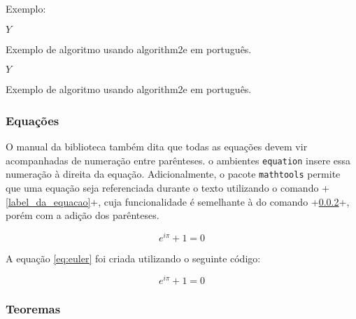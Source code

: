 \documentclass[xindy,rascunho]{fei}
\begin{document}
    Exemplo:

\begin{latexcode}
\begin{algorithm}
	\Retorna \(Y\)
	\caption{Exemplo de algoritmo usando algorithm2e em português.}
	\label{lst:alg}
\end{algorithm}
\end{latexcode}
    
\begin{algorithm}


\Retorna \(Y\)

\caption{Exemplo de algoritmo usando algorithm2e em português.}
\label{lst:alg}
\end{algorithm}
	
	\subsubsection{Equações}
	
	O manual da biblioteca também dita que todas as equações devem vir acompanhadas de numeração entre parênteses. o ambientes \texttt{equation} insere essa numeração à direita da equação. Adicionalmente, o pacote \texttt{mathtools} permite que uma equação seja referenciada durante o texto utilizando o comando \latexinline+\eqref{label_da_equacao}+, cuja funcionalidade é semelhante à do comando \latexinline+\ref{}+, porém com a adição dos parênteses.
	
	\begin{equation} \label{eq:euler}
	e^{i\pi}+1=0
	\end{equation}
	
	A equação \eqref{eq:euler} foi criada utilizando o seguinte código:
	
	\begin{latexcode}
	\begin{equation} \label{eq:euler}
	e^{i\pi}+1=0
	\end{equation}	
	\end{latexcode}
	
	\subsubsection{Teoremas}
	
\end{document}
